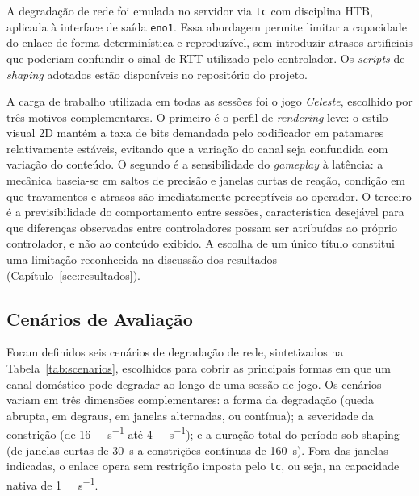 A degradação de rede foi emulada no servidor via \texttt{tc}
com disciplina HTB, aplicada à interface de saída \texttt{eno1}.
Essa abordagem permite limitar a capacidade do enlace de forma
determinística e reproduzível, sem introduzir atrasos
artificiais que poderiam confundir o sinal de RTT utilizado
pelo controlador. Os \emph{scripts} de \emph{shaping} adotados estão disponíveis
no repositório do projeto.

A carga de trabalho utilizada em todas as sessões foi o jogo
\emph{Celeste}, escolhido por três motivos complementares. O
primeiro é o perfil de \emph{rendering} leve: o estilo
visual 2D mantém a taxa de bits demandada pelo codificador em
patamares relativamente estáveis, evitando que a variação do
canal seja confundida com variação do conteúdo. O segundo é a
sensibilidade do \emph{gameplay} à latência: a mecânica
baseia-se em saltos de precisão e janelas curtas de reação,
condição em que travamentos e atrasos são imediatamente
perceptíveis ao operador. O terceiro é a previsibilidade do
comportamento entre sessões, característica desejável para que
diferenças observadas entre controladores possam ser atribuídas
ao próprio controlador, e não ao conteúdo exibido. A escolha de
um único título constitui uma limitação reconhecida na
discussão dos resultados (Capítulo~\ref{sec:resultados}).

\subsection{Cenários de Avaliação}

Foram definidos seis cenários de degradação de rede,
sintetizados na Tabela~\ref{tab:scenarios}, escolhidos para
cobrir as principais formas em que um canal doméstico pode
degradar ao longo de uma sessão de jogo. Os cenários variam em
três dimensões complementares: a forma da degradação (queda
abrupta, em degraus, em janelas alternadas, ou contínua); a
severidade da constrição (de \SI{16}{\mega\bit\per\second}
até \SI{4}{\mega\bit\per\second}); e a duração total do
período sob shaping (de janelas curtas de \SI{30}{\second} a
constrições contínuas de \SI{160}{\second}). Fora das janelas
indicadas, o enlace opera sem restrição imposta pelo
\texttt{tc}, ou seja, na capacidade nativa de \SI{1}{\giga\bit\per\second}.

